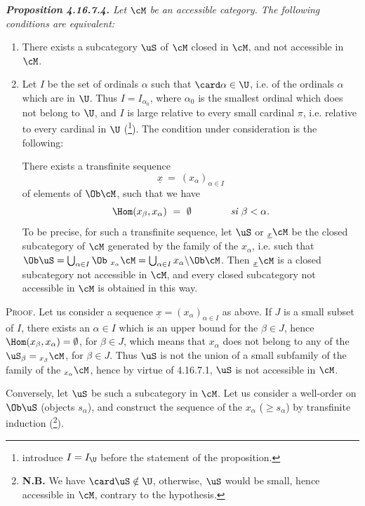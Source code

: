 \begingroup\itshape
\noindent\textbf{\upshape Proposition 4.16.7.4.} Let $\cM$ be an accessible category. The following conditions are equivalent:
\begin{enumerate}[label={}]
\item[a)] There exists a subcategory $\uS$ of $\cM$ closed in $\cM$, and not accessible in $\cM$.
\item[b)] Let $I$ be the set of ordinals $\alpha$ such that $\card \alpha \in \U$, i.e. of the
ordinals $\alpha$ which are in $\U$. Thus $I = I_{\alpha_0}$, where $\alpha_0$ is the smallest ordinal which does not belong to $\U$, and $I$ is large relative to every small cardinal $\pi$, i.e. relative to every cardinal in $\U$ \textup{(}\footnote{introduce $I = I_{\U}$ before the statement of the proposition.}\textup{)}. The condition under consideration is the following:

There exists a transfinite sequence %
\[
\underline{x} \ =\ (x_\alpha)_{\alpha\in I}
\]
of elements of $\Ob \cM$, such that we have
\[
\Hom(x_\beta, x_\alpha) \ =\ \emptyset \qquad\qquad \textit{si } \beta < \alpha.
\]
To be precise, for such a transfinite sequence, let $\uS$ or ${}_{\underline{x}}\cM$ be the closed subcategory of $\cM$ generated by the family of the $x_\alpha$, i.e. such that $\Ob \uS = \bigcup_{\alpha\in I} \Ob\ {}_{x_\alpha}\cM = \bigcup_{\alpha\in I} x_\alpha\backslash\Ob \cM$. Then ${}_{\underline{x}}\cM$ is a closed subcategory not accessible in $\cM$, and every closed subcategory not accessible in $\cM$ is obtained in this way.
\end{enumerate}
\endgroup

\textsc{Proof}. Let us consider a sequence $\underline{x} = (x_\alpha)_{\alpha\in I}$ as above. If $J$ is a small subset of $I$, there exists an $\alpha \in I$ which is an upper bound for the $\beta \in J$, hence $\Hom(x_\beta, x_\alpha) = \emptyset$, for $\beta \in J$,
which means that $x_\alpha$ does not belong to any of the $\uS_\beta = {}_{x_\beta}\cM$, for $\beta \in J$. Thus $\uS$ is not the union of a small subfamily of the family of the ${}_{x_\alpha}\cM$, hence by virtue of 4.16.7.1, $\uS$ is not accessible in $\cM$. %

Conversely, let $\uS$ be such a subcategory in $\cM$. Let us consider a well-order on $\Ob \uS$ (objects $s_\alpha$), and construct the sequence of the $x_\alpha$ ($\geqslant s_\alpha$) by transfinite induction (\footnote{\textbf{N.B.} We have $\card \uS \notin \U$, otherwise, $\uS$ would be small, hence accessible in $\cM$, contrary to the hypothesis.}).

